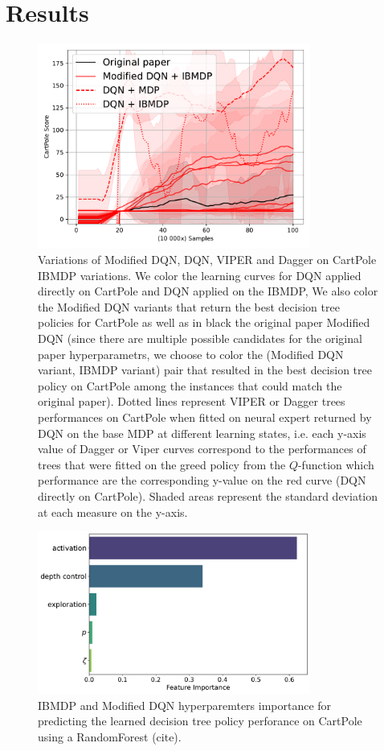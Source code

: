 \section{Results}
\begin{figure}
    \centering
    \includegraphics[width=0.8\textwidth]{images/images_part1/dqn.pdf}
    \caption{Variations of Modified DQN, DQN, VIPER and Dagger on CartPole IBMDP variations. We color the learning curves for DQN applied directly on CartPole and DQN applied on the IBMDP,
    We also color the Modified DQN variants that return the best decision tree policies for CartPole as well as in black the original paper Modified DQN (since there are multiple possible candidates for the original paper hyperparametrs, we choose to color the (Modified DQN variant, IBMDP variant) pair that resulted in the best decision tree policy on CartPole among the instances that could match the original paper).
    Dotted lines represent VIPER or Dagger trees performances on CartPole when fitted on neural expert returned by DQN on the base MDP at different learning states, i.e. each y-axis value of Dagger or Viper curves correspond to the performances of trees that were fitted on the greed policy from the $Q$-function which performance are the corresponding y-value on the red curve (DQN directly on CartPole).
    Shaded areas represent the standard deviation at each measure on the y-axis.}
\end{figure}

\begin{figure}
    \centering
    \includegraphics[width=0.8\textwidth]{images/images_part1/hyperparameter_importance_dqn.pdf}
    \caption{IBMDP and Modified DQN hyperparemters importance for predicting the learned decision tree policy perforance on CartPole using a RandomForest (cite).}
\end{figure}


